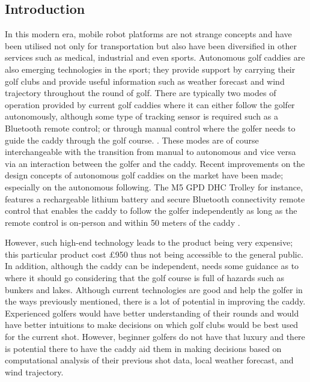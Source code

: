 \documentclass[11pt,landscape]{article}
\begin{document}

\newpage
\begin{multicols}{2}
\tableofcontents
\newpage
\section{Introduction}
In this modern era, mobile robot platforms are not strange concepts and have
been utilised not only for transportation but also have been diversified in
other services such as medical, industrial and even sports. Autonomous golf
caddies are also emerging technologies in the sport; they provide support
by carrying their golf clubs and provide useful information such as weather
forecast and wind trajectory throughout the round of golf. There are typically
two modes of operation provided by current golf caddies where it can either
follow the golfer autonomously, although some type of tracking sensor is required
such as a Bluetooth remote control; or through manual control where the
golfer needs to guide the caddy through the golf course.
\cite{choi_2020}. These modes are of course interchangeable with the transition
from manual to autonomous and vice versa via an interaction between the
golfer and the caddy. Recent improvements on the design concepts of autonomous
golf caddies on the market have been made; especially on the autonomous
following. The M5 GPD DHC Trolley for instance, features a rechargeable lithium
battery and secure Bluetooth connectivity remote control that enables the caddy
to follow the golfer independently as long as the remote control is on-person
and within 50 meters of the caddy \cite{golf_2022}.

However, such high-end technology leads to the product being very expensive;
this particular product cost £950 thus not being accessible to the general
public. In addition, although the caddy can be independent, needs some
guidance as to where it should go considering that the golf course is full of
hazards such as bunkers and lakes. Although current technologies are
good and help the golfer in the ways previously mentioned, there is a lot of
potential in improving the caddy. Experienced golfers would have better
understanding of their rounds and would have better intuitions to make decisions
on which golf clubs would be best used for the current shot. However,
beginner golfers do not have that luxury and there is potential there to have
the caddy aid them in making decisions based on computational analysis of their
previous shot data, local weather forecast, and wind trajectory. 


\end{multicols}
\end{document}
